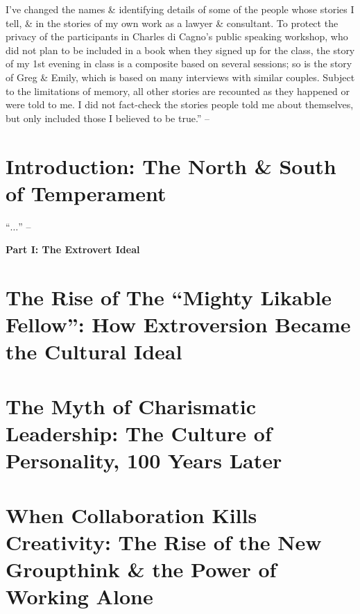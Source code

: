\documentclass{article}
\numberwithin{equation}{section}
\begin{document}
I've changed the names \& identifying details of some of the people whose stories I tell, \& in the stories of my own work as a lawyer \& consultant. To protect the privacy of the participants in Charles di Cagno's public speaking workshop, who did not plan to be included in a book when they signed up for the class, the story of my 1st evening in class is a composite based on several sessions; so is the story of Greg \& Emily, which is based on many interviews with similar couples. Subject to the limitations of memory, all other stories are recounted as they happened or were told to me. I did not fact-check the stories people told me about themselves, but only included those I believed to be true.'' -- \cite[p. 12]{Cain2013}


\section*{Introduction: The North \& South of Temperament}
``$\ldots$'' -- \cite{Cain2013}


\begin{center}\LARGE\sf
	\textbf{Part I: The Extrovert Ideal}
\end{center}

\section{The Rise of The ``Mighty Likable Fellow'': How Extroversion Became the Cultural Ideal}


\section{The Myth of Charismatic Leadership: The Culture of Personality, 100 Years Later}


\section{When Collaboration Kills Creativity: The Rise of the New Groupthink \& the Power of Working Alone}
\end{document}
